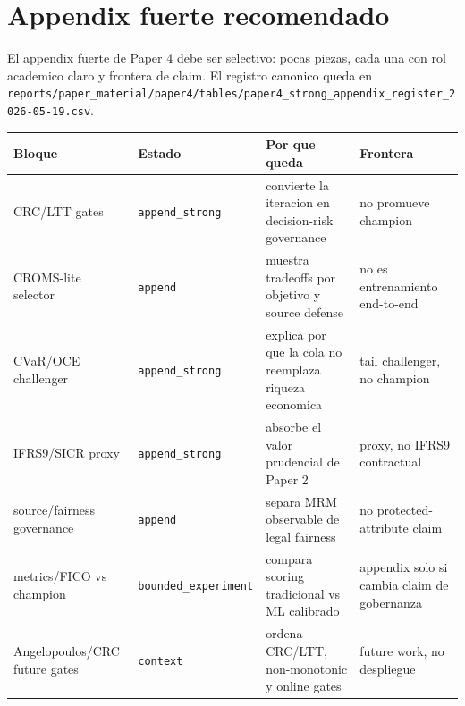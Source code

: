 \documentclass[
  spanish,
  11pt,
  letterpaper,
]{scrbook}
\newcounter{none} %
\theoremstyle{plain}
\theoremstyle{remark}
\begin{document}
\section{Appendix fuerte recomendado}\label{appendix-fuerte-recomendado}

El appendix fuerte de Paper 4 debe ser selectivo: pocas piezas, cada una
con rol academico claro y frontera de claim. El registro canonico queda
en
\texttt{reports/paper\_material/paper4/tables/paper4\_strong\_appendix\_register\_2026-05-19.csv}.

{\def\LTcaptype{none} %
\begin{longtable}[]{@{}
  >{\raggedright\arraybackslash}p{}
  >{\raggedright\arraybackslash}p{}
  >{\raggedright\arraybackslash}p{}
  >{\raggedright\arraybackslash}p{}@{}}
\toprule\noalign{}
\begin{minipage}[b]{\linewidth}\raggedright
Bloque
\end{minipage} & \begin{minipage}[b]{\linewidth}\raggedright
Estado
\end{minipage} & \begin{minipage}[b]{\linewidth}\raggedright
Por que queda
\end{minipage} & \begin{minipage}[b]{\linewidth}\raggedright
Frontera
\end{minipage} \\
\midrule\noalign{}
\endhead
\bottomrule\noalign{}
\endlastfoot
CRC/LTT gates & \texttt{append\_strong} & convierte la iteracion en
decision-risk governance & no promueve champion \\
CROMS-lite selector & \texttt{append} & muestra tradeoffs por objetivo y
source defense & no es entrenamiento end-to-end \\
CVaR/OCE challenger & \texttt{append\_strong} & explica por que la cola
no reemplaza riqueza economica & tail challenger, no champion \\
IFRS9/SICR proxy & \texttt{append\_strong} & absorbe el valor prudencial
de Paper 2 & proxy, no IFRS9 contractual \\
source/fairness governance & \texttt{append} & separa MRM observable de
legal fairness & no protected-attribute claim \\
metrics/FICO vs champion & \texttt{bounded\_experiment} & compara
scoring tradicional vs ML calibrado & appendix solo si cambia claim de
gobernanza \\
Angelopoulos/CRC future gates & \texttt{context} & ordena CRC/LTT,
non-monotonic y online gates & future work, no despliegue \\
\end{longtable}
}
\end{document}
